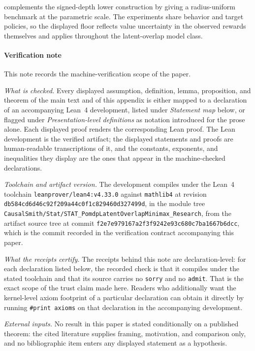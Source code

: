  complements the signed-depth lower construction by giving a radius-uniform benchmark at the parametric scale. The experiments share behavior and target policies, so the displayed floor reflects value uncertainty in the observed rewards themselves and applies throughout the latent-overlap model class.

\paragraph{Verification note}
This note records the machine-verification scope of the paper.

\emph{What is checked.} Every displayed assumption, definition, lemma, proposition, and theorem of the main text and of this appendix is either mapped to a declaration of an accompanying Lean~4 development, listed under \emph{Statement map} below, or flagged under \emph{Presentation-level definitions} as notation introduced for the prose alone. Each displayed proof renders the corresponding Lean proof. The Lean development is the verified artifact; the displayed statements and proofs are human-readable transcriptions of it, and the constants, exponents, and inequalities they display are the ones that appear in the machine-checked declarations.

\emph{Toolchain and artifact version.} The development compiles under the Lean~4 toolchain \texttt{leanprover/lean4:v4.33.0} against \texttt{mathlib4} at revision \texttt{db584cd6d46c92f209a44c0f1c829460d327499d}, in the module tree \texttt{CausalSmith/Stat/STAT\_PomdpLatentOverlapMinimax\_Research}, from the artifact source tree at commit \texttt{f2e7e979167a2f3f9242e93c680c7ba1667b6dcc}, which is the commit recorded in the verification contract accompanying this paper.

\emph{What the receipts certify.} The receipts behind this note are declaration-level: for each declaration listed below, the recorded check is that it compiles under the stated toolchain and that its source carries no \texttt{sorry} and no \texttt{admit}. That is the exact scope of the trust claim made here. Readers who additionally want the kernel-level axiom footprint of a particular declaration can obtain it directly by running \texttt{\#print axioms} on that declaration in the accompanying development.

\emph{External inputs.} No result in this paper is stated conditionally on a published theorem: the cited literature supplies framing, motivation, and comparison only, and no bibliographic item enters any displayed statement as a hypothesis.

